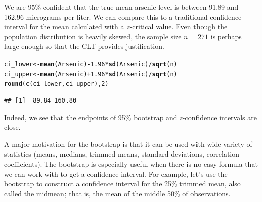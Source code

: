 \documentclass[fleqn, 12pt]{article}\usepackage[]{graphicx}\usepackage[]{color}
\makeatletter
\newcommand{\hlnum}[1]{\textcolor[rgb]{0.686,0.059,0.569}{#1}}%
\newcommand{\hlopt}[1]{\textcolor[rgb]{0,0,0}{#1}}%
\newcommand{\hlstd}[1]{\textcolor[rgb]{0.345,0.345,0.345}{#1}}%
\newcommand{\hlkwb}[1]{\textcolor[rgb]{0.69,0.353,0.396}{#1}}%
\newcommand{\hlkwd}[1]{\textcolor[rgb]{0.737,0.353,0.396}{\textbf{#1}}}%
\newenvironment{kframe}{%
 \def\at@end@of@kframe{}%
 \ifinner\ifhmode%
  \def\at@end@of@kframe{\end{minipage}}%
  \begin{minipage}{\columnwidth}%
 \fi\fi%
 \def\FrameCommand##1{\hskip\@totalleftmargin \hskip-\fboxsep
 \colorbox{shadecolor}{##1}\hskip-\fboxsep
     \hskip-\linewidth \hskip-\@totalleftmargin \hskip\columnwidth}%
 \MakeFramed {\advance\hsize-\width
   \@totalleftmargin\z@ \linewidth\hsize
   \@setminipage}}%
 {\par\unskip\endMakeFramed%
 \at@end@of@kframe}
\newenvironment{knitrout}{}{} %
\makeatother
\begin{document}
We are 95\% confident that the true mean arsenic level is between 91.89 and 162.96 micrograms per liter.  We can compare this to a traditional confidence interval for the mean calculated with a $z$-critical value.  Even though the population distribution is heavily skewed, the sample size $n=271$ is perhaps large enough so that the CLT provides justification.  

\begin{knitrout}
\color{fgcolor}\begin{kframe}
\begin{alltt}
\hlstd{ci_lower} \hlkwb{<-} \hlkwd{mean}\hlstd{(Arsenic)} \hlopt{-} \hlnum{1.96} \hlopt{*} \hlkwd{sd}\hlstd{(Arsenic)} \hlopt{/} \hlkwd{sqrt}\hlstd{(n)}
\hlstd{ci_upper} \hlkwb{<-} \hlkwd{mean}\hlstd{(Arsenic)} \hlopt{+} \hlnum{1.96} \hlopt{*} \hlkwd{sd}\hlstd{(Arsenic)} \hlopt{/} \hlkwd{sqrt}\hlstd{(n)}
\hlkwd{round}\hlstd{(}\hlkwd{c}\hlstd{(ci_lower, ci_upper),} \hlnum{2}\hlstd{)}
\end{alltt}
\begin{verbatim}
## [1]  89.84 160.80
\end{verbatim}
\end{kframe}
\end{knitrout}

Indeed, we see that the endpoints of 95\% bootstrap and $z$-confidence intervals are close.
\clearpage

A major motivation for the bootstrap is that it can be used with wide variety of statistics (means, medians, trimmed means, standard deviations, correlation coefficients).  The bootstrap is especially useful when there is no easy formula that we can work with to get a confidence interval.  For example, let's use the bootstrap to construct a confidence interval for the 25\% trimmed mean, also called the midmean; that is, the mean of the middle 50\% of observations.  
\end{document}
